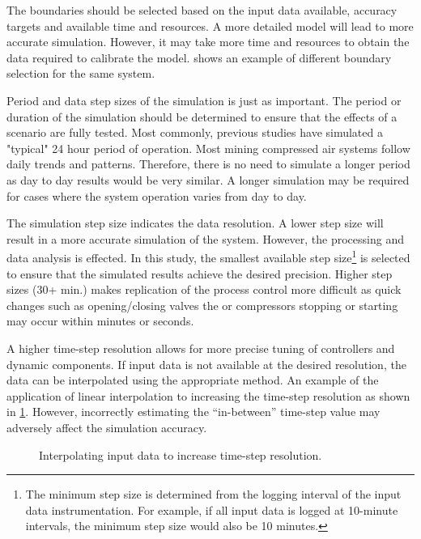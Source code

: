 	\par 
	The boundaries should be selected based on the input data available, accuracy targets and available time and resources. A more detailed model will lead to more accurate simulation. However, it may take more time and resources to obtain the data required to calibrate the model.  shows an example of different boundary selection for the same system.
	\par
	Period and data step sizes of the simulation is just as important. The period or duration of the simulation should be determined to ensure that the effects of a scenario are fully tested. Most commonly, previous studies have simulated a "typical" 24 hour period of operation. Most mining compressed air systems follow daily trends and patterns. Therefore, there is no need to simulate a longer period as day to day results would be very similar. A longer simulation may be required for cases where the system operation varies from day to day.
	\par 
	The simulation step size indicates the data resolution. A lower step size will result in a more accurate simulation of the system. However, the processing and data analysis is effected. In this study, the smallest available step size\footnote{The minimum step size is determined from the logging interval of the input data instrumentation. For example, if all input data is logged at 10-minute intervals, the minimum step size would also be 10 minutes.} is selected to ensure that the simulated results achieve the desired precision. Higher step sizes (30+ min.) makes replication of the process control more difficult as quick changes such as opening/closing valves the or compressors stopping or starting may occur within minutes or seconds.
	\par
	A higher time-step resolution allows for more precise tuning of controllers and dynamic components. If input data is not available at the desired resolution, the data can be interpolated using the appropriate method. An example of the application of linear interpolation to increasing the time-step resolution as shown in \cref{fig: Inter}. However, incorrectly estimating the \enquote{in-between}  time-step value may adversely affect the simulation accuracy.
	
	\begin{figure}[h]
		\centering
		\fbox{}
		\caption{Interpolating input data to increase time-step resolution.}
		\label{fig: Inter}
	\end{figure}
